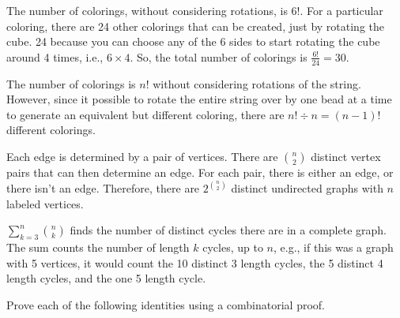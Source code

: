 \documentclass[11pt]{article}
\begin{document}
\begin{solution}
    \begin{Parts}

        \Part The number of colorings, without considering rotations, is $6!$. 
        For a particular coloring, there are 24 other colorings that can be 
        created, just by rotating the cube. 24 because you can choose any of the 
        6 sides to start rotating the cube around 4 times, i.e., $6 \times 4$. So,
        the total number of colorings is $\frac{6!}{24} = 30$.

        \Part The number of colorings is $n!$ without considering rotations of the
        string. However, since it possible to rotate the entire string over by one 
        bead at a time to generate an equivalent but different coloring, there are $n!
        \div n = (n-1)!$ different colorings.

        \Part Each edge is determined by a pair of vertices. There are 
        $\binom{n}{2}$ distinct vertex pairs that can then determine an edge. For 
        each pair, there is either an edge, or there isn't an edge. Therefore,
        there are $2^{\binom{n}{2}}$ distinct undirected graphs with $n$ labeled
        vertices. 

        \Part $\sum_{k=3}^{n} \binom{n}{k}$ finds the number of distinct cycles there 
        are in a complete graph. The sum counts the number of length $k$ cycles, 
        up to $n$, e.g., if this was a graph with 5 vertices, it would count the 10
        distinct 3 length cycles, the 5 distinct 4 length cycles, and the one 5 length
        cycle. 

    \end{Parts}
\end{solution}

Prove each of the following identities using a combinatorial proof.
\end{document}
